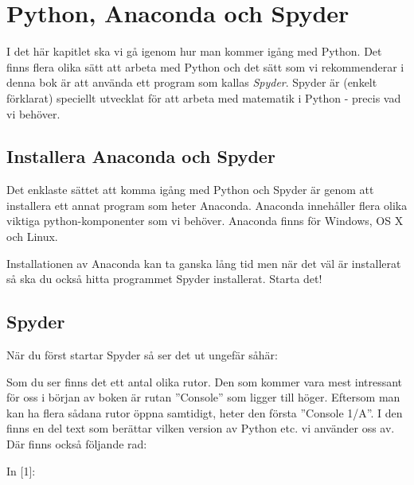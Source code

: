 %
%

\chapter{Python, Anaconda och Spyder}\label{ch:installation}
I det här kapitlet ska vi gå igenom hur man kommer igång med Python. Det finns flera olika sätt att arbeta med Python och det sätt som vi rekommenderar i denna bok är att använda ett program som kallas \emph{Spyder}. Spyder är (enkelt förklarat) speciellt utvecklat för att arbeta med matematik i Python - precis vad vi behöver. 

\section{Installera Anaconda och Spyder}
Det enklaste sättet att komma igång med Python och Spyder är genom att installera ett annat program som heter Anaconda. Anaconda innehåller flera olika viktiga python-komponenter som vi behöver. Anaconda finns för Windows, OS X och Linux.


Installationen av Anaconda kan ta ganska lång tid men när det väl är installerat så ska du också hitta programmet Spyder installerat. Starta det!
\newpage
\section{Spyder}
När du först startar Spyder så ser det ut ungefär såhär:


Som du ser finns det ett antal olika rutor. Den som kommer vara mest intressant för oss i början av boken är rutan ''Console'' som ligger till höger. Eftersom man kan ha flera sådana rutor öppna samtidigt, heter den första ''Console 1/A''. I den finns en del text som berättar vilken version av Python etc. vi använder oss av. Där finns också följande rad:

\begin{python}[caption={Tom kommando-rad},label={}]
In [1]:
\end{python}

